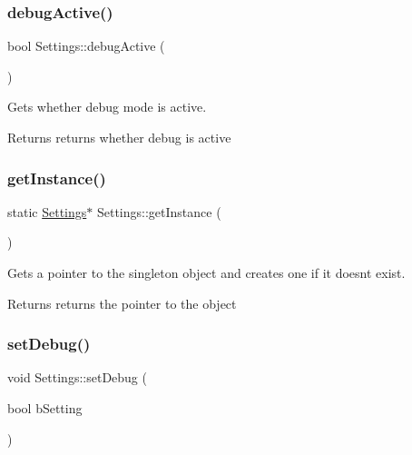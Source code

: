 \subsubsection{\texorpdfstring{debug\+Active()}{debugActive()}}
{\footnotesize\ttfamily bool Settings\+::debug\+Active (\begin{DoxyParamCaption}{ }\end{DoxyParamCaption})}



Gets whether debug mode is active. 

\begin{DoxyReturn}{Returns}
returns whether debug is active 
\end{DoxyReturn}
\mbox{\label{class_settings_a1d30c7fd15c578e94f3c87212c2340da}} 
\subsubsection{\texorpdfstring{get\+Instance()}{getInstance()}}
{\footnotesize\ttfamily static \hyperlink{class_settings}{Settings}$\ast$ Settings\+::get\+Instance (\begin{DoxyParamCaption}{ }\end{DoxyParamCaption})\hspace{0.3cm}{\ttfamily [static]}}



Gets a pointer to the singleton object and creates one if it doesnt exist. 

\begin{DoxyReturn}{Returns}
returns the pointer to the object 
\end{DoxyReturn}
\mbox{\label{class_settings_a1c098494c4aef82ac1fa267735d544d1}} 
\subsubsection{\texorpdfstring{set\+Debug()}{setDebug()}}
{\footnotesize\ttfamily void Settings\+::set\+Debug (\begin{DoxyParamCaption}\item[{bool}]{b\+Setting }\end{DoxyParamCaption})}



